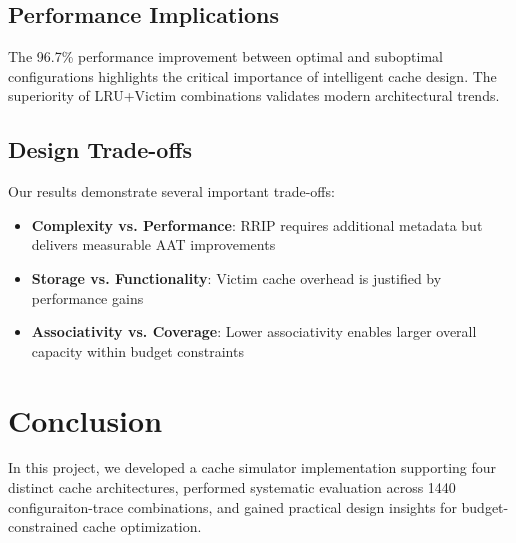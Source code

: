 \documentclass[sigconf,nonacm,natbib=false]{acmart}
\begin{document}
\subsection{Performance Implications}

The 96.7\% performance improvement between optimal and suboptimal configurations highlights the critical importance of intelligent cache design. The superiority of LRU+Victim combinations validates modern architectural trends.

\subsection{Design Trade-offs}

Our results demonstrate several important trade-offs:
\begin{itemize}
\item \textbf{Complexity vs. Performance}: RRIP requires additional metadata but delivers measurable AAT improvements
\item \textbf{Storage vs. Functionality}: Victim cache overhead is justified by performance gains
\item \textbf{Associativity vs. Coverage}: Lower associativity enables larger overall capacity within budget constraints
\end{itemize}



\section{Conclusion}

In this project, we developed a cache simulator implementation supporting four distinct cache architectures, performed systematic evaluation across 1440 configuraiton-trace combinations, and gained practical design insights for budget-constrained cache optimization.
\end{document}
